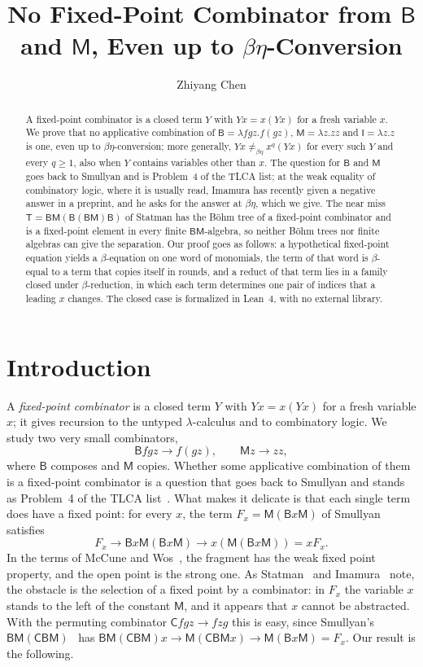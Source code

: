 \documentclass[a4paper,english]{lipics-v2021}
\title{No Fixed-Point Combinator from \texorpdfstring{$\mathsf{B}$}{B} and \texorpdfstring{$\mathsf{M}$}{M}, Even up to \texorpdfstring{$\beta\eta$}{beta-eta}-Conversion}
\author{Zhiyang Chen}{Preprint, not peer reviewed. Prepared with AI assistance; see ``Provenance and verification''.}{}{}{}
\newcommand{\B}{\mathsf{B}}
\newcommand{\M}{\mathsf{M}}
\newcommand{\I}{\mathsf{I}}
\newcommand{\Cc}{\mathsf{C}}
\newcommand{\T}{\mathsf{T}}
\newcommand{\neqbe}{\neq_{\beta\eta}}
\begin{document}
\maketitle

\begin{abstract}
A fixed-point combinator is a closed term $Y$ with $Yx = x(Yx)$ for a fresh variable $x$. We prove that no applicative combination of $\B = \lambda fgz.f(gz)$, $\M = \lambda z.zz$ and $\I = \lambda z.z$ is one, even up to $\beta\eta$-conversion; more generally, $Yx \neqbe x^q(Yx)$ for every such $Y$ and every $q \geq 1$, also when $Y$ contains variables other than $x$. The question for $\B$ and $\M$ goes back to Smullyan and is Problem~4 of the TLCA list; at the weak equality of combinatory logic, where it is usually read, Imamura has recently given a negative answer in a preprint, and he asks for the answer at $\beta\eta$, which we give. The near miss $\T = \B\M(\B(\B\M)\B)$ of Statman has the Böhm tree of a fixed-point combinator and is a fixed-point element in every finite $\B\M$-algebra, so neither Böhm trees nor finite algebras can give the separation. Our proof goes as follows: a hypothetical fixed-point equation yields a $\beta$-equation on one word of monomials, the term of that word is $\beta$-equal to a term that copies itself in rounds, and a reduct of that term lies in a family closed under $\beta$-reduction, in which each term determines one pair of indices that a leading $x$ changes. The closed case is formalized in Lean~4, with no external library.
\end{abstract}

\section{Introduction}\label{sec:intro}

A \emph{fixed-point combinator} is a closed term $Y$ with $Yx = x(Yx)$ for a fresh variable $x$; it gives recursion to the untyped $\lambda$-calculus and to combinatory logic. We study two very small combinators,
\[
\B fgz \to f(gz), \qquad \M z \to zz ,
\]
where $\B$ composes and $\M$ copies. Whether some applicative combination of them is a fixed-point combinator is a question that goes back to Smullyan and stands as Problem~4 of the TLCA list~\cite{tlca}. What makes it delicate is that each single term does have a fixed point: for every $x$, the term $F_x = \M(\B x\M)$ of Smullyan~\cite[p.~108]{smullyan} satisfies
\[
F_x \to \B x\M(\B x\M) \to x(\M(\B x\M)) = xF_x .
\]
In the terms of McCune and Wos~\cite[p.~222]{mccunewos}, the fragment has the weak fixed point property, and the open point is the strong one. As Statman~\cite{tlca} and Imamura~\cite[p.~1]{imamura1} note, the obstacle is the selection of a fixed point by a combinator: in $F_x$ the variable $x$ stands to the left of the constant $\M$, and it appears that $x$ cannot be abstracted. With the permuting combinator $\Cc fgz \to fzg$ this is easy, since Smullyan's $\B\M(\Cc\B\M)$~\cite[p.~136]{smullyan} has $\B\M(\Cc\B\M)x \to \M(\Cc\B\M x) \to \M(\B x\M) = F_x$. Our result is the following.
\end{document}
